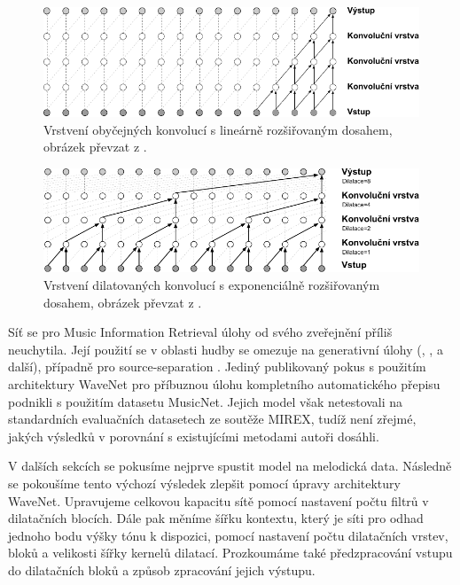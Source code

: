\begin{figure}[h!]\centering
\includegraphics[scale=0.7]{../img/wavenet_konvoluce_grey}
\caption{Vrstvení obyčejných konvolucí s lineárně rozšiřovaným dosahem, obrázek převzat z \cite{Oord2016}.}
\label{obr:wavenet_conv}
\end{figure}

\begin{figure}[h!]\centering
\includegraphics[scale=0.7]{../img/wavenet_dilatace_konvoluce_grey}
\caption{Vrstvení dilatovaných konvolucí s exponenciálně rozšiřovaným dosahem, obrázek převzat z \cite{Oord2016}.}
\label{obr:wavenet_dilated}
\end{figure}

Síť se pro Music Information Retrieval úlohy od svého zveřejnění příliš neuchytila. Její použití se v oblasti hudby se omezuje na generativní úlohy (\cite{Hawthorne2018a}, \cite{Yang2017}, \cite{Engel2017} a další), případně pro source-separation \citep{Stoller2018}. Jediný publikovaný pokus s použitím architektury WaveNet pro příbuznou úlohu kompletního automatického přepisu podnikli \cite{Martak2018} s použitím datasetu MusicNet. Jejich model však netestovali na standardních evaluačních datasetech ze soutěže MIREX, tudíž není zřejmé, jakých výsledků v porovnání s existujícími metodami autoři dosáhli.

V dalších sekcích se pokusíme nejprve spustit model \cite{Martak2018} na melodická data. Následně se pokoušíme tento výchozí výsledek zlepšit pomocí úpravy architektury WaveNet. Upravujeme celkovou kapacitu sítě pomocí nastavení počtu filtrů v dilatačních blocích. Dále pak měníme šířku kontextu, který je síti pro odhad jednoho bodu výšky tónu k dispozici, pomocí nastavení počtu dilatačních vrstev, bloků a velikosti šířky kernelů dilatací. Prozkoumáme také předzpracování vstupu do dilatačních bloků a způsob zpracování jejich výstupu.

